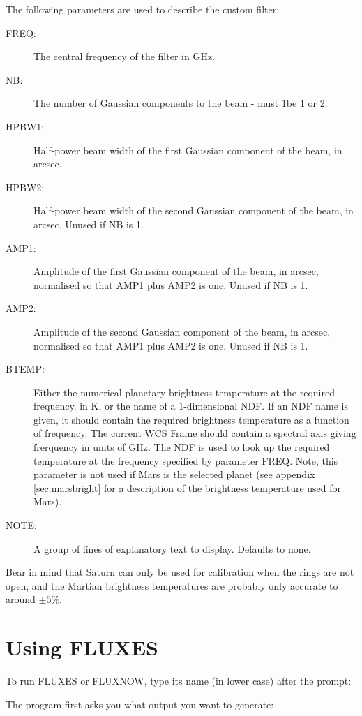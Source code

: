 \documentclass[11pt,twoside]{starlink}
\begin{document}
The following parameters are used to describe the custom filter:
\begin{description}
\item[FREQ:] The central frequency of the filter in GHz.
\item[NB:] The number of Gaussian components to the beam - must 1be 1 or 2.
\item[HPBW1:] Half-power beam width of the first Gaussian component of the
beam, in arcsec.
\item[HPBW2:] Half-power beam width of the second Gaussian component of the
beam, in arcsec. Unused if NB is 1.
\item[AMP1:] Amplitude of the first Gaussian component of the beam, in
arcsec, normalised so that AMP1 plus AMP2 is one. Unused if NB is 1.
\item[AMP2:] Amplitude of the second Gaussian component of the beam, in
arcsec, normalised so that AMP1 plus AMP2 is one. Unused if NB is 1.
\item[BTEMP:] Either the numerical planetary brightness temperature at the
required frequency, in K, or the name of a 1-dimensional NDF. If an NDF
name is given, it should contain the required brightness temperature
as a function of frequency. The current WCS Frame should contain a spectral
axis giving frerquency in units of GHz. The NDF is used to look up the
required temperature at the frequency specified by parameter FREQ. Note,
this parameter is not used if Mars is the selected planet (see appendix
\ref{sec:marsbright} for a description of the brightness temperature used
for Mars).
\item[NOTE:] A group of lines of explanatory text to display. Defaults to
none.
\end{description}

Bear in mind that Saturn can only be used for calibration when the
rings are not open, and the Martian brightness temperatures are probably
only accurate to around $\pm5$\%.

\section{Using FLUXES}
\label{sec:using}

To run FLUXES or FLUXNOW, type its name (in lower case) after the prompt:

\begin{terminalv}
\end{terminalv}

The program first asks you what output you want to generate:
\end{document}
